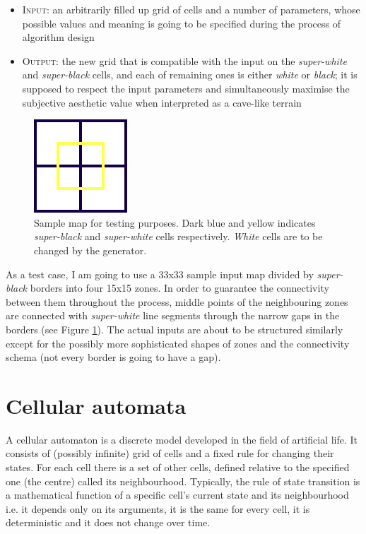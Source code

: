 \documentclass[a4paper, 11pt]{article} %
\begin{document}
\begin{itemize}
	\item \textsc{Input:} an arbitrarily filled up grid of cells and a number of parameters, whose possible values and meaning is going to be specified during the process of algorithm design
	\item \textsc{Output:} the new grid that is compatible with the input on the \emph{super-white} and \emph{super-black} cells, and each of remaining ones is either \emph{white} or \emph{black}; it is supposed to respect the input parameters and simultaneously maximise the subjective aesthetic value when interpreted as a cave-like terrain
\end{itemize}

\begin{figure}
	\centering
	\includegraphics[scale=1.0]{input}
	\caption{Sample map for testing purposes. Dark blue and yellow indicates \emph{super-black} and \emph{super-white} cells respectively. \emph{White} cells are to be changed by the generator.}
	\label{fig:input}
\end{figure}

As a test case, I am going to use a 33x33 sample input map divided by \emph{super-black} borders into four 15x15 zones. In order to guarantee the connectivity between them throughout the process, middle points of the neighbouring zones are connected with \emph{super-white} line segments through the narrow gaps in the borders (see Figure \ref{fig:input}). The actual inputs are about to be structured similarly except for the possibly more sophisticated shapes of zones and the connectivity schema (not every border is going to have a gap).


\section*{Cellular automata}

A cellular automaton is a discrete model developed in the field of artificial life. It consists of (possibly infinite) grid of cells and a fixed rule for changing their states. For each cell there is a set of other cells, defined relative to the specified one (the centre) called its neighbourhood. Typically, the rule of state transition is a mathematical function of a specific cell's current state and its neighbourhood i.e. it depends only on its arguments, it is the same for every cell, it is deterministic and it does not change over time. 
\end{document}

